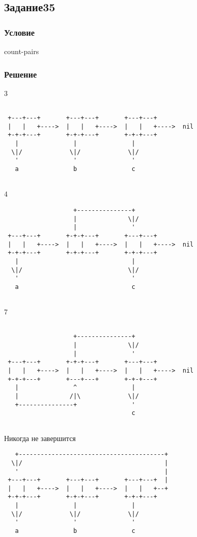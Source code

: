 \documentclass[10pt,a4paper]{article}
\begin{document}
\subsection*{Задание35}
\subsubsection*{Условие}
count-pairs             
\subsubsection*{Решение}
3                       
\begin{lstlisting}      
                        
 +---+---+       +---+---+       +---+---+
 |   |   +---->  |   |   +---->  |   |   +---->  nil
 +-+-+---+       +-+-+---+       +-+-+---+
   |               |               |
  \|/             \|/             \|/
   '               '               '
   a               b               c
                        
\end{lstlisting}        
4                       
\begin{lstlisting}      
                   +---------------+
                   |              \|/
                   |               '
 +---+---+       +-+-+---+       +---+---+
 |   |   +---->  |   |   +---->  |   |   +---->  nil
 +-+-+---+       +-+-+---+       +-+-+---+
   |                               |
  \|/                             \|/
   '                               '
   a                               c
                        
\end{lstlisting}        
7                       
\begin{lstlisting}      
                        
                   +---------------+
                   |              \|/
                   |               '
 +---+---+       +-+-+---+       +---+---+
 |   |   +---->  |   |   +---->  |   |   +---->  nil
 +-+-+---+       +---+---+       +-+-+---+
   |               ^               |
   |              /|\             \|/
   +---------------+               '
                                   c
                        
\end{lstlisting}        
Никогда не завершится   
\begin{lstlisting}      
   +----------------------------------------+
  \|/                                       |
   '                                        |
 +---+---+       +---+---+       +---+---+  |
 |   |   +---->  |   |   +---->  |   |   +--+
 +-+-+---+       +-+-+---+       +-+-+---+
   |               |               |
  \|/             \|/             \|/
   '               '               '
   a               b               c
                        
\end{lstlisting}        
                        
\end{document}
